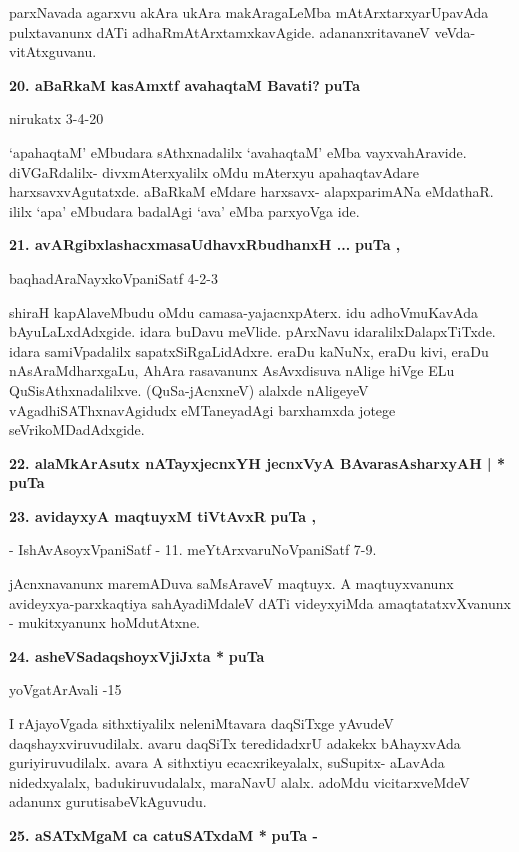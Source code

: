 \smallskip
parxNavada agarxvu akAra ukAra makAragaLeMba mAtArxtarxyarUpavAda pulxtavanunx dATi adhaRmAtArxtamxkavAgide. adananxritavaneV veVda-vitAtxguvanu.

\medskip
\noindent
\textbf{20. aBaRkaM kasAmxtf avahaqtaM Bavati?} \hfill{\bf puTa }

\hfill{nirukatx 3-4-20}

\smallskip
`apahaqtaM' eMbudara sAthxnadalilx `avahaqtaM' eMba vayxvahAravide. diVGaRdalilx- divxmAterxyalilx oMdu mAterxyu apahaqtavAdare harxsavxvAgutatxde. aBaRkaM eMdare harxsavx- alapxparimANa eMdathaR. ililx `apa' eMbudara badalAgi `ava' eMba parxyoVga ide.

\medskip
\noindent
\textbf{21. avARgibxlashacxmasaUdhavxRbudhanxH ...} \hfill{\bf puTa , }

\hfill{baqhadAraNayxkoVpaniSatf 4-2-3}

\smallskip
shiraH kapAlaveMbudu oMdu camasa-yajacnxpAterx. idu adhoVmuKavAda bAyuLaLxdAdxgide. idara buDavu meVlide. pArxNavu idaralilxDalapxTiTxde. idara samiVpadalilx sapatxSiRgaLidAdxre. eraDu kaNuNx, eraDu kivi, eraDu nAsAraMdharxgaLu, AhAra rasavanunx AsAvxdisuva nAlige hiVge ELu QuSisAthxnadalilxve. (QuSa-jAcnxneV) alalxde nAligeyeV vAgadhiSAThxnavAgidudx eMTaneyadAgi barxhamxda jotege seVrikoMDadAdxgide.

\medskip
\noindent
\textbf{22. alaMkArAsutx nATayxjecnxYH jecnxVyA BAvarasAsharxyAH | *} \hfill{\bf puTa }

\medskip
\noindent
\textbf{23. avidayxyA maqtuyxM tiVtAvxR} \hfill{\bf puTa , }

\smallskip
\hfill{- IshAvAsoyxVpaniSatf - 11. meYtArxvaruNoVpaniSatf 7-9.}

\smallskip
jAcnxnavanunx maremADuva saMsAraveV maqtuyx. A maqtuyxvanunx avideyxya-parxkaqtiya sahAyadiMdaleV dATi videyxyiMda amaqtatatxvXvanunx - mukitxyanunx hoMdutAtxne.

\medskip
\noindent
\textbf{24. asheVSadaqshoyxVjiJxta *} \hfill{\bf puTa }

\hfill{yoVgatArAvali -15}

\smallskip
I rAjayoVgada sithxtiyalilx neleniMtavara daqSiTxge yAvudeV daqshayxviruvudilalx. avaru daqSiTx teredidadxrU adakekx bAhayxvAda guriyiruvudilalx. avara A sithxtiyu ecacxrikeyalalx, suSupitx- aLavAda nidedxyalalx, badukiruvudalalx, maraNavU alalx. adoMdu vicitarxveMdeV adanunx gurutisabeVkAguvudu.

\medskip
\noindent
\textbf{25. aSATxMgaM ca catuSATxdaM *} \hfill{\bf puTa -}

